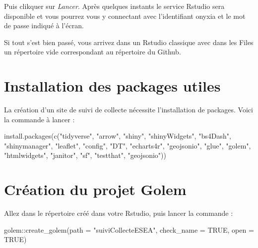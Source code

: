 \documentclass[
  letterpaper,
  DIV=11,
  numbers=noendperiod]{scrreprt}
\newenvironment{Shaded}{\begin{snugshade}}{\end{snugshade}}
\newcommand{\AttributeTok}[1]{\textcolor[rgb]{0.40,0.45,0.13}{#1}}
\newcommand{\ConstantTok}[1]{\textcolor[rgb]{0.56,0.35,0.01}{#1}}
\newcommand{\FunctionTok}[1]{\textcolor[rgb]{0.28,0.35,0.67}{#1}}
\newcommand{\NormalTok}[1]{\textcolor[rgb]{0.00,0.23,0.31}{#1}}
\newcommand{\SpecialCharTok}[1]{\textcolor[rgb]{0.37,0.37,0.37}{#1}}
\newcommand{\StringTok}[1]{\textcolor[rgb]{0.13,0.47,0.30}{#1}}
\begin{document}
Puis clikquer sur \emph{Lancer}. Après quelques instants le service
Rstudio sera disponible et vous pourrez vous y connectant avec
l'identifiant onyxia et le mot de passe indiqué à l'écran.

Si tout s'est bien passé, vous arrivez dans un Rstudio classique avec
dans les Files un répertoire vide correspondant au répertoire du Github.

\hypertarget{installation-des-packages-utiles}{%
\section{Installation des packages
utiles}\label{installation-des-packages-utiles}}

La création d'un site de suivi de collecte nécessite l'installation de
packages. Voici la commande à lancer :

\begin{Shaded}
\begin{Highlighting}[]
\FunctionTok{install.packages}\NormalTok{(}\FunctionTok{c}\NormalTok{(}\StringTok{"tidyverse"}\NormalTok{, }\StringTok{"arrow"}\NormalTok{, }\StringTok{"shiny"}\NormalTok{, }\StringTok{"shinyWidgets"}\NormalTok{, }\StringTok{"bs4Dash"}\NormalTok{, }\StringTok{"shinymanager"}\NormalTok{, }\StringTok{"leaflet"}\NormalTok{, }\StringTok{"config"}\NormalTok{, }\StringTok{"DT"}\NormalTok{, }\StringTok{"echarts4r"}\NormalTok{, }\StringTok{"geojsonio"}\NormalTok{, }\StringTok{"glue"}\NormalTok{, }\StringTok{"golem"}\NormalTok{, }\StringTok{"htmlwidgets"}\NormalTok{, }\StringTok{"janitor"}\NormalTok{, }\StringTok{"sf"}\NormalTok{, }\StringTok{"testthat"}\NormalTok{, }\StringTok{"geojsonio"}\NormalTok{))}
\end{Highlighting}
\end{Shaded}

\hypertarget{cruxe9ation-du-projet-golem}{%
\section{Création du projet Golem}\label{cruxe9ation-du-projet-golem}}

Allez dans le répertoire créé dans votre Rstudio, puis lancer la
commande :

\begin{Shaded}
\begin{Highlighting}[]
\NormalTok{golem}\SpecialCharTok{::}\FunctionTok{create\_golem}\NormalTok{(}\AttributeTok{path =} \StringTok{"suiviCollecteESEA"}\NormalTok{, }\AttributeTok{check\_name =} \ConstantTok{TRUE}\NormalTok{, }\AttributeTok{open =} \ConstantTok{TRUE}\NormalTok{)}
\end{Highlighting}
\end{Shaded}
\end{document}
